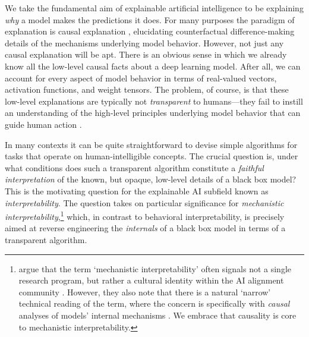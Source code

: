 \documentclass[twoside,11pt]{article}
\begin{document}
We take the fundamental aim of explainable artificial intelligence to be explaining \emph{why} a model makes the predictions it does. For many purposes the paradigm of explanation is causal explanation \citep{Woodward2003, pearl:2019}, elucidating counterfactual difference-making details of the mechanisms underlying model behavior. However, not just any causal explanation will be apt. There is an obvious sense in which we already know all the low-level causal facts about a deep learning model. After all, we can account for every aspect of model behavior in terms of real-valued vectors, activation functions, and weight tensors. The problem, of course, is that these low-level explanations are typically not \emph{transparent} to humans---they fail to instill an understanding of the high-level principles underlying model behavior \citep{Lipton18, Creel2020} that can guide human action \citep{Karimi2021, Karimi2023}.


In many contexts it can be quite straightforward to devise simple algorithms for tasks that operate on human-intelligible concepts. 
The crucial question is, under what conditions does such a transparent algorithm constitute a \emph{faithful interpretation} \citep{Jacovi2020} of the known, but opaque, low-level details of a black box model? This is the motivating question for the explainable AI subfield known as \emph{interpretability}. The question takes on particular significance for \emph{mechanistic interpretability},\footnote{\cite{Saphra2024} argue that the term `mechanistic interpretability' often signals not a single research program, but rather a cultural identity within the AI alignment community \citep{olah2020zoom,  elhage2021mathematical,  wang2023interpretability, Nandagrok}. However, they also note that there is a natural `narrow' technical reading of the term, where the concern is specifically with \emph{causal} analyses of models' internal mechanisms \citep{vig2020causal, geiger-etal:2020:blackbox,geiger2021causal,Geiger-etal:2023:DAS, finlayson-etal-2021-causal, Meng:2022, Stolfo23, Todd2024,prakash2024finetuning, mueller2024questrightmediatorhistory}.  We embrace that causality is core to mechanistic interpretability.} which, in contrast to behavioral interpretability, is precisely aimed at reverse engineering the \textit{internals} of a black box model in terms of a transparent algorithm.  %
\end{document}
